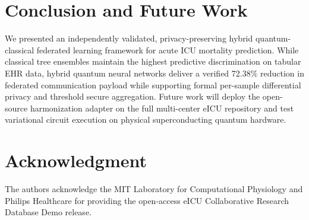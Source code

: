 \documentclass[conference]{IEEEtran}
\begin{document}
\section{Conclusion and Future Work}
We presented an independently validated, privacy-preserving hybrid quantum-classical federated learning framework for acute ICU mortality prediction. While classical tree ensembles maintain the highest predictive discrimination on tabular EHR data, hybrid quantum neural networks deliver a verified 72.38\% reduction in federated communication payload while supporting formal per-sample differential privacy and threshold secure aggregation. Future work will deploy the open-source harmonization adapter on the full multi-center eICU repository and test variational circuit execution on physical superconducting quantum hardware.

\section*{Acknowledgment}
The authors acknowledge the MIT Laboratory for Computational Physiology and Philips Healthcare for providing the open-access eICU Collaborative Research Database Demo release.



\end{document}
